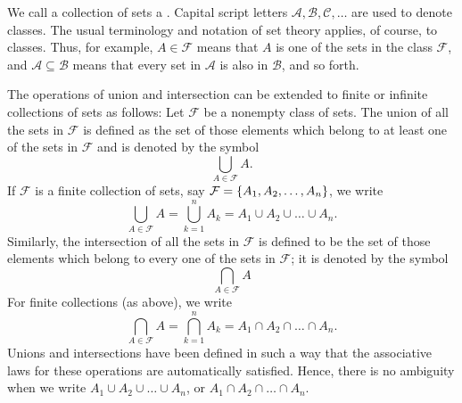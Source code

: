 \begin{defn}\label{defn:1.2.8}
  We call a collection of sets a \textbf{}.
  Capital script letters \(\mathcal{A}, \mathcal{B}, \mathcal{C}, \dots\) are used to denote classes.
  The usual terminology and notation of set theory applies, of course, to classes.
  Thus, for example, \(A \in \mathcal{F}\) means that \(A\) is one of the sets in the class \(\mathcal{F}\), and \(\mathcal{A} \subseteq \mathcal{B}\) means that every set in \(\mathcal{A}\) is also in \(\mathcal{B}\), and so forth.
\end{defn}

\begin{defn}\label{defn:1.2.9}
  The operations of union and intersection can be extended to finite or infinite collections of sets as follows:
  Let \(\mathcal{F}\) be a nonempty class of sets.
  The union of all the sets in \(\mathcal{F}\) is defined as the set of those elements which belong to at least one of the sets in \(\mathcal{F}\) and is denoted by the symbol
  \[
    \bigcup_{A \in \mathcal{F}} A.
  \]
  If \(\mathcal{F}\) is a finite collection of sets, say \(\mathcal{F} = \left\lbrace A_1, A_2, \dots, A_n\right\rbrace\), we write
  \[
    \bigcup_{A \in \mathcal{F}} A = \bigcup_{k = 1}^n A_k = A_1 \cup A_2 \cup \dots \cup A_n.
  \]
  Similarly, the intersection of all the sets in \(\mathcal{F}\) is defined to be the set of those elements which belong to every one of the sets in \(\mathcal{F}\);
  it is denoted by the symbol
  \[
    \bigcap_{A \in \mathcal{F}} A
  \]
  For finite collections (as above), we write
  \[
    \bigcap_{A \in \mathcal{F}} A = \bigcap_{k = 1}^n A_k = A_1 \cap A_2 \cap \dots \cap A_n.
  \]
  Unions and intersections have been defined in such a way that the associative laws for these operations are automatically satisfied.
  Hence, there is no ambiguity when we write \(A_1 \cup A_2 \cup \dots \cup A_n\), or \(A_1 \cap A_2 \cap \dots \cap A_n\).
\end{defn}
